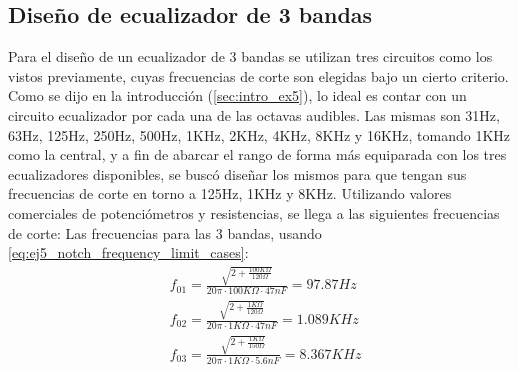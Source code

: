 \subsection{Diseño de ecualizador de 3 bandas}
Para el diseño de un ecualizador de 3 bandas se utilizan tres circuitos como los vistos previamente, cuyas frecuencias de corte son elegidas bajo un cierto criterio.
Como se dijo en la introducción (\ref{sec:intro_ex5}), lo ideal es contar con un circuito ecualizador por cada una de las octavas audibles.
Las mismas son 31Hz, 63Hz, 125Hz, 250Hz, 500Hz, 1KHz, 2KHz, 4KHz, 8KHz y 16KHz, tomando 1KHz como la central, y a fin de abarcar el rango de forma más equiparada con los 
tres ecualizadores disponibles, se buscó diseñar los mismos para que tengan sus frecuencias de corte en torno a 125Hz, 1KHz y 8KHz.
Utilizando valores comerciales de potenciómetros y resistencias, se llega a las siguientes frecuencias de corte:
Las frecuencias para las 3 bandas, usando \ref{eq:ej5_notch_frequency_limit_cases}:
\begin{align}
    &f_{01} = \frac{\sqrt{2 + \frac{100 K\Omega}{120\Omega}}}{20\pi \cdot 100 K\Omega \cdot 47 nF} = 97.87 Hz \\
    &f_{02} = \frac{\sqrt{2 + \frac{1 K\Omega}{120\Omega}}}{20\pi \cdot 1 K\Omega \cdot 47 nF} = 1.089 KHz \\
    &f_{03} = \frac{\sqrt{2 + \frac{1 K\Omega}{150\Omega}}}{20\pi \cdot 1 K\Omega \cdot 5.6 nF} = 8.367 KHz
\end{align}

